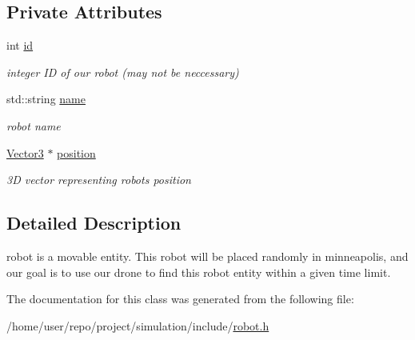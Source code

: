 \subsection*{Private Attributes}
\begin{DoxyCompactItemize}
\item 
\mbox{\label{classRobot_ad7fd8fd1721ae41eb67246b9b360e7a6}} 
int \hyperlink{classRobot_ad7fd8fd1721ae41eb67246b9b360e7a6}{id}
\begin{DoxyCompactList}\small\item\em integer ID of our robot (may not be neccessary) \end{DoxyCompactList}\item 
\mbox{\label{classRobot_ae11f12fef20c4252161c6b774a436f1d}} 
std\+::string \hyperlink{classRobot_ae11f12fef20c4252161c6b774a436f1d}{name}
\begin{DoxyCompactList}\small\item\em robot name \end{DoxyCompactList}\item 
\mbox{\label{classRobot_a824bd711291c3fa12736732c372e1701}} 
\hyperlink{classVector3}{Vector3} $\ast$ \hyperlink{classRobot_a824bd711291c3fa12736732c372e1701}{position}
\begin{DoxyCompactList}\small\item\em 3D vector representing robot\textquotesingle{}s position \end{DoxyCompactList}\end{DoxyCompactItemize}


\subsection{Detailed Description}
robot is a movable entity. This robot will be placed randomly in minneapolis, and our goal is to use our drone to find this robot entity within a given time limit. 

The documentation for this class was generated from the following file\+:\begin{DoxyCompactItemize}
\item 
/home/user/repo/project/simulation/include/\hyperlink{robot_8h}{robot.\+h}\end{DoxyCompactItemize}
